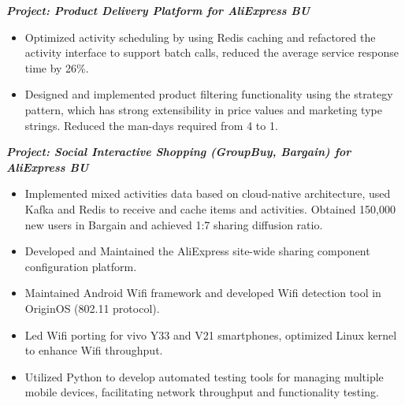 \documentclass{resume}
\begin{document}

\setlength{\parindent}{1em}


\textit{\textbf{\hspace{1em}Project: Product Delivery Platform for AliExpress BU}}
\begin{itemize}
  \item Optimized activity scheduling by using Redis caching and refactored the activity interface to support batch calls, reduced the average service response time by 26\%.
    \item Designed and implemented product filtering functionality using the strategy pattern, which has strong extensibility in price values and marketing type strings. Reduced the man-days required from 4 to 1.
    
\end{itemize}

\textit{\textbf{Project: Social Interactive Shopping (GroupBuy, Bargain) for AliExpress BU}}
\begin{itemize}
 \item Implemented mixed activities data based on cloud-native architecture, used Kafka and Redis to receive and cache items and activities. Obtained 150,000 new users in Bargain and achieved 1:7 sharing diffusion ratio.
 \item Developed and Maintained the AliExpress site-wide sharing component configuration platform.

\end{itemize}

\begin{itemize}
  \item Maintained Android Wifi framework and developed Wifi detection tool in OriginOS (802.11 protocol).
  \item Led Wifi porting for vivo Y33 and V21 smartphones, optimized Linux kernel to enhance Wifi throughput.
  \item Utilized Python to develop automated testing tools for managing multiple mobile devices, facilitating network throughput and functionality testing.
\end{itemize}
\end{document}
